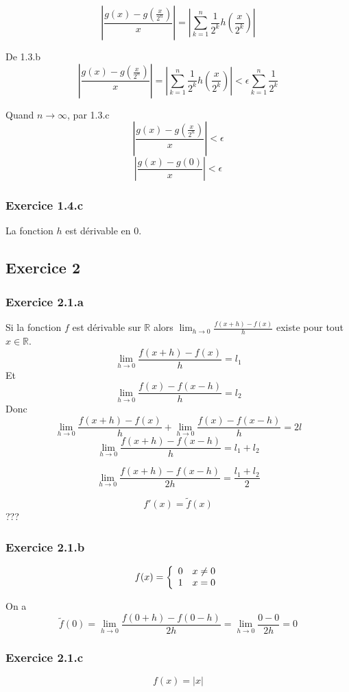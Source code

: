 \documentclass[]{book}
\theoremstyle{definition}
\newcommand{\bb}[1]{\mathbb{#1}}
\newcommand{\R}{\bb{R}}
\begin{document}
$$\left| \frac{g(x) - g(\frac{x}{2^n})}{x} \right| = \left| \sum_{k=1}^{n} {\frac{1}{2^k}h\left(\frac{x}{2^k}\right)} \right| $$

De 1.3.b
$$\left| \frac{g(x) - g(\frac{x}{2^n})}{x} \right| = \left| \sum_{k=1}^{n} {\frac{1}{2^k}h\left(\frac{x}{2^k}\right)} \right|  < \epsilon \sum_{k=1}^{n}{\frac{1}{2^k}}$$

Quand $n \to \infty$, par 1.3.c
$$\left| \frac{g(x) - g(\frac{x}{2^n})}{x} \right| < \epsilon $$
$$\left| \frac{g(x) - g(0)}{x} \right| < \epsilon $$

\subsubsection*{Exercice 1.4.c}
La fonction $h$ est d\'erivable en 0.\\

\subsection*{Exercice 2}
\subsubsection*{Exercice 2.1.a}
Si la  fonction $f$ est d\'erivable sur $\R$ alors $\lim_{h \to 0} \frac{f(x+h) - f(x)}{h}$ existe pour tout $x \in \R$. \\
$$\lim_{h \to 0} \frac{f(x+h) - f(x)}{h} = l_1$$
Et
$$\lim_{h \to 0} \frac{f(x) - f(x-h)}{h} = l_2$$
Donc
$$\lim_{h \to 0} \frac{f(x+h) - f(x)}{h} + \lim_{h \to 0} \frac{f(x) - f(x-h)}{h} = 2l$$
$$\lim_{h \to 0} \frac{f(x+h) - f(x-h)}{h} = l_1 + l_2$$

$$\lim_{h \to 0} \frac{f(x+h) - f(x-h)}{2h} = \frac{l_1 + l_2}{2}$$

$$f'(x) = \tilde{f}(x)$$
???


\subsubsection*{Exercice 2.1.b}
$$
f(x) = \left\{ 
\begin{array}{l l}
0 & x \neq 0 \\
1 & x = 0 \\
\end{array}
\right.
$$

On a 
$$\tilde{f}(0)= \lim_{h \to 0} \frac{f(0+h)-f(0-h)}{2h} = \lim_{h \to 0} \frac{0 - 0}{2h} = 0$$

\subsubsection*{Exercice 2.1.c}
$$f(x) = |x|$$
\end{document}
